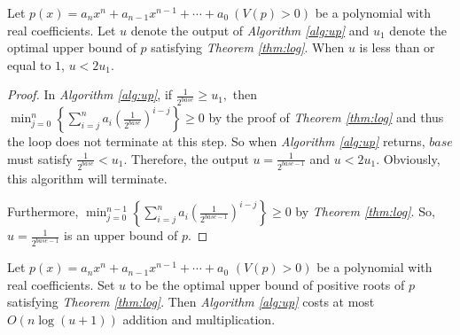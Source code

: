 \begin{theorem}
	\label{thm:two}
	Let $p(x)=a_nx^n+a_{n-1}x^{n-1}+\cdots+a_0\ (V(p)> 0)$ be a polynomial with real coefficients. Let  $u$ denote the output of {\em Algorithm \ref{alg:up}} and $u_1$ denote the optimal upper bound of $p$ satisfying
	{\em Theorem \ref{thm:log}}. When $u$ is less than or equal to $1$, $u<2u_1$.
	
\end{theorem}


\begin{proof}
	In {\em Algorithm \ref{alg:up}}, if  $\frac{1}{2^{base}}\ge u_1,$ then $\min_{j=0}^{n}\left\{ \sum_{i=j}^na_i\left( {\frac{1}{2^{base}} }
	\right)^{i-j}\right \}\ge 0$ by the proof of {\em Theorem \ref{thm:log}} and thus
	the loop does not terminate at this step.
	So when {\em Algorithm \ref{alg:up}} returns, $base$ must satisfy $\frac{1}{2^{base}}<u_1$. Therefore, the output $u=\frac{1}{2^{base-1}}$ and $u<2u_1$.
	Obviously, this algorithm will terminate.
	
	Furthermore,  $\min_{j=0}^{n-1}\left\{ \sum_{i=j}^na_i\left( {\frac{1}{2^{base-1}} } \right)^{i-j}\right \}\ge 0$ by {\em Theorem \ref{thm:log}}. So, $u=\frac{1}{2^{base-1}}$ is an upper bound of $p$.
\end{proof}

\begin{corollary}
	Let $p(x)=a_nx^n+a_{n-1}x^{n-1}+\cdots+a_0$ $ (V(p)> 0)$ be a polynomial with real coefficients. Set $u$ to be the optimal upper bound of positive roots of $p$ satisfying {\em Theorem	\ref{thm:log}}. Then  {\em Algorithm \ref{alg:up}} costs at most $O(n\log(u+1))$  addition and multiplication. %
\end{corollary}


